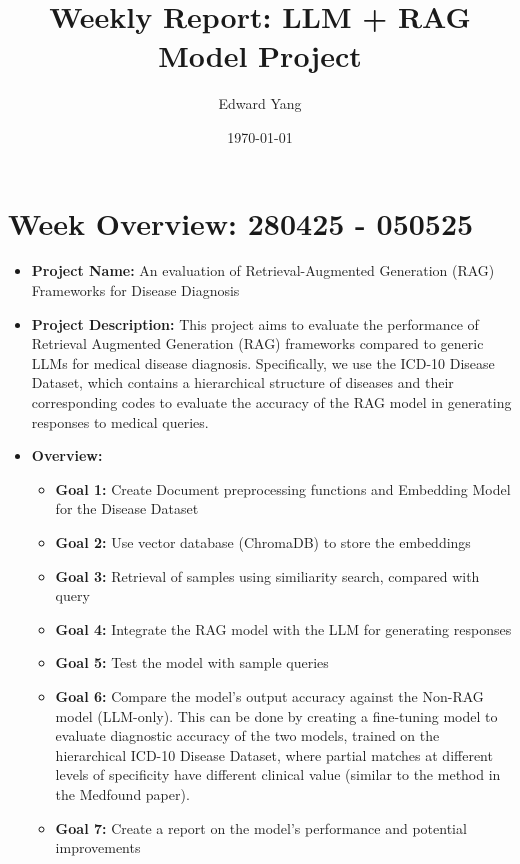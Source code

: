 \documentclass[12pt]{article}
\title{Weekly Report: LLM + RAG Model Project}
\author{Edward Yang}
\date{\today}
\begin{document}
\maketitle

\section*{Week Overview: 280425 - 050525}
\begin{itemize}
    \item \textbf{Project Name:} An evaluation of Retrieval-Augmented Generation (RAG) Frameworks for Disease Diagnosis
    \item \textbf{Project Description:} This project aims to evaluate the performance of Retrieval Augmented Generation (RAG) frameworks compared to generic LLMs for medical disease diagnosis. Specifically, we use the ICD-10 Disease Dataset, which contains a hierarchical structure of diseases and their corresponding codes to evaluate the accuracy of the RAG model in generating responses to medical queries.
    \item \textbf{Overview:}
    \begin{itemize}[leftmargin=*]
        \item \textbf{Goal 1:} Create Document preprocessing functions and Embedding Model for the Disease Dataset
        \item \textbf{Goal 2:} Use vector database (ChromaDB) to store the embeddings
        \item \textbf{Goal 3:} Retrieval of samples using similiarity search, compared with query
        \item \textbf{Goal 4:} Integrate the RAG model with the LLM for generating responses
        \item \textbf{Goal 5:} Test the model with sample queries
        \item \textbf{Goal 6:} Compare the model's output accuracy against the Non-RAG model (LLM-only). This can be done by creating a fine-tuning model to evaluate diagnostic accuracy of the two models, trained on the hierarchical ICD-10 Disease Dataset, where partial matches at different levels of specificity have different clinical value (similar to the method in the Medfound paper).
        \item \textbf{Goal 7:} Create a report on the model's performance and potential improvements
    \end{itemize}
\end{itemize}
\end{document}
